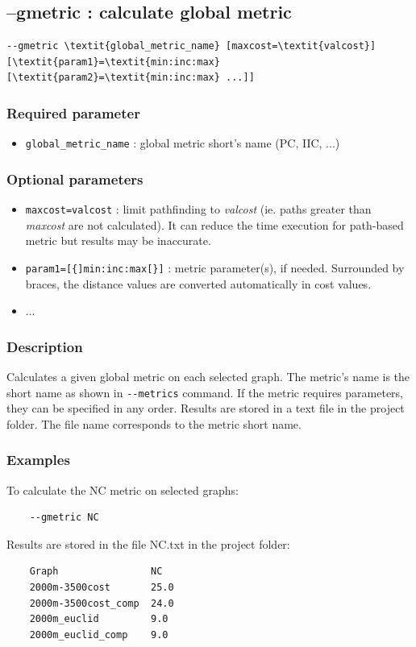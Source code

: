 \documentclass[a4paper,10pt]{report}
\begin{document}
\subsection{--gmetric : calculate global metric}
\begin{Verbatim}[commandchars=\\\{\}]
--gmetric \textit{global_metric_name} [maxcost=\textit{valcost}] [\textit{param1}=\textit{min:inc:max} [\textit{param2}=\textit{min:inc:max} ...]]
\end{Verbatim}

\subsubsection{Required parameter}
\begin{itemize}
	\item \verb|global_metric_name| : global metric short's name (PC, IIC, ...)
\end{itemize}

\subsubsection{Optional parameters}
\begin{itemize}
	\item \verb|maxcost=valcost| : limit pathfinding to \textit{valcost} (ie. paths greater than \textit{maxcost} are not calculated). It can reduce the time execution for path-based metric but results may be inaccurate.
	\item \verb|param1=[{]min:inc:max[}]| : metric parameter(s), if needed. Surrounded by braces, the distance values are converted automatically in cost values.
	\item ...
\end{itemize}

\subsubsection{Description}
Calculates a given global metric on each selected graph. 
The metric's name is the short name as shown in \verb|--metrics| command.
If the metric requires parameters, they can be specified in any order.
Results are stored in a text file in the project folder. The file name corresponds to the metric short name.

\subsubsection{Examples}
To calculate the NC metric on selected graphs:
\begin{Verbatim}
	--gmetric NC
\end{Verbatim}
Results are stored in the file NC.txt in the project folder:
\begin{Verbatim}
	Graph                NC
	2000m-3500cost       25.0
	2000m-3500cost_comp  24.0
	2000m_euclid         9.0
	2000m_euclid_comp    9.0
\end{Verbatim}
\end{document}
